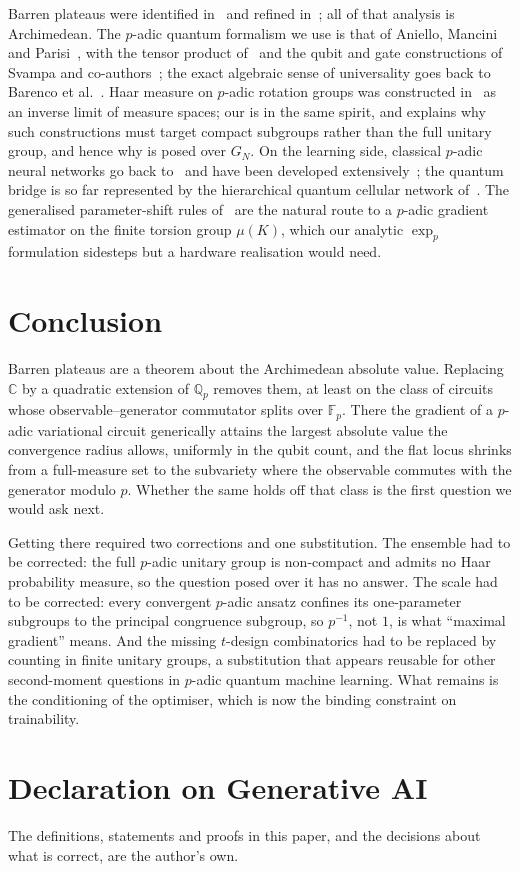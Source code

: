 \documentclass{ceurart}
\theoremstyle{plain}
\theoremstyle{definition}
\theoremstyle{remark}
\theoremstyle{plain}
\newcommand{\Qp}{\mathbb{Q}_p}
\newcommand{\FF}{\mathbb{F}}
\begin{document}
Barren plateaus were identified in~\cite{Mc18} and refined
in~\cite{Ce21,Ho22}; all of that analysis is Archimedean. The $p$-adic quantum
formalism we use is that of Aniello, Mancini and
Parisi~\cite{AMP23,AMP24,AMP23trace}, with the tensor product
of~\cite{Mu25tensor} and the qubit and gate constructions of Svampa and
co-authors~\cite{SMW22qub,SLMW26gates}; the exact algebraic sense of
universality goes back to Barenco et al.~\cite{Ba95}. Haar measure on $p$-adic
rotation groups was constructed in~\cite{AMP24haar} as an inverse limit of
measure spaces; our  is in the same spirit, and
 explains why such constructions must target compact
subgroups rather than the full unitary group, and hence why
 is posed over $G_N$. On the learning side, classical $p$-adic neural networks
go back to~\cite{Kh98} and have been developed
extensively~\cite{ZuGa22,ZG24dnn,ZG26crit,Ma25}; the quantum bridge is so far
represented by the hierarchical quantum cellular network of~\cite{ZGZ26qnn}.
The generalised parameter-shift rules of~\cite{Cr19,Wi22} are the natural route
to a $p$-adic gradient estimator on the finite torsion group $\mu(K)$, which
our analytic $\exp_p$ formulation sidesteps but a hardware realisation would
need.

\section{Conclusion}
\label{sec:conclusion}

Barren plateaus are a theorem about the Archimedean absolute value. Replacing
$\mathbb{C}$ by a quadratic extension of $\Qp$ removes them, at least on the
class of circuits whose observable--generator commutator splits over $\FF_p$.
There the gradient of a $p$-adic variational circuit generically attains the
largest absolute value the convergence radius allows, uniformly in the qubit
count, and the flat locus shrinks from a full-measure set to the subvariety
where the observable commutes with the generator modulo $p$. Whether the same
holds off that class is the first question we would ask next.

Getting there required two corrections and one substitution. The ensemble had
to be corrected: the full $p$-adic unitary group is non-compact and admits no
Haar probability measure, so the question posed over it has no answer.
The scale had to be corrected: every convergent $p$-adic ansatz confines its
one-parameter subgroups to the principal congruence subgroup, so $p^{-1}$, not
$1$, is what ``maximal gradient'' means. And the missing $t$-design
combinatorics had to be replaced by counting in finite unitary groups, a
substitution that appears reusable for other second-moment questions in
$p$-adic quantum machine learning. What remains is the conditioning of the
optimiser, which is now the binding constraint on trainability.

\section*{Declaration on Generative AI}

The definitions, statements and proofs in this paper, and the decisions about
what is correct, are the author's own.


\end{document}
